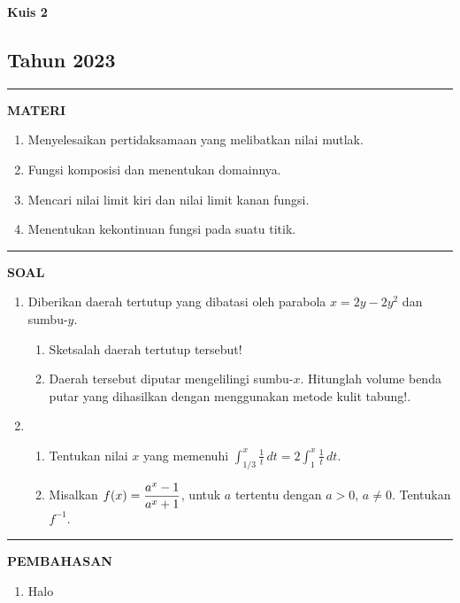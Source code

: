 \begin{flushright}
    \textbf{\Large{Kuis 2}}
    \subsection*{Tahun 2023}
\end{flushright}
\vspace{0.5cm}
\hrule height 2pt
\vspace{0.5cm}
\begin{center}
    \textbf{\large{MATERI}}
    \begin{enumerate}[leftmargin=*, label={\arabic*}.]
        \item Menyelesaikan pertidaksamaan yang melibatkan nilai mutlak.
        \item Fungsi komposisi dan menentukan domainnya.
        \item Mencari nilai limit kiri dan nilai limit kanan fungsi.
        \item Menentukan kekontinuan fungsi pada suatu titik.
    \end{enumerate}
\end{center}
\vspace{0.2cm}
\hrule height 1pt
\vspace{0.5cm}
\begin{center}
    \textbf{\large{SOAL}}
\end{center}
\begin{enumerate}[leftmargin=*, label={\arabic*}.]
\item Diberikan daerah tertutup yang dibatasi oleh parabola $x=2y-2y^{2}$ 
dan sumbu-$y$.
\begin{enumerate}[label={\alph*}.]
    \item Sketsalah daerah tertutup tersebut!
    \item Daerah tersebut diputar mengelilingi sumbu-$x$. Hitunglah volume 
    benda putar yang dihasilkan dengan menggunakan metode kulit tabung!.
\end{enumerate}
\item \begin{enumerate}[label={\alph*}.]
    \item Tentukan nilai $x$ yang memenuhi 
    $\int_{1/3}^{x}\frac{1}{t}\,dt=2\int_{1}^{x}\frac{1}{t}\,dt$.
    \item Misalkan $\displaystyle f(x)=\frac{a^{x}-1}{a^{x}+1}$, untuk $a$ tertentu dengan $a > 0$, $a\neq 0$.
    Tentukan $f^{-1}$.
\end{enumerate}
\end{enumerate}
\vspace{0.2cm}
\hrule height 1pt
\vspace{0.5cm}

\begin{center}
    \textbf{\large{PEMBAHASAN}}
\end{center}
\begin{enumerate}[leftmargin=*, label={\arabic*}.]
\item Halo
\end{enumerate}
